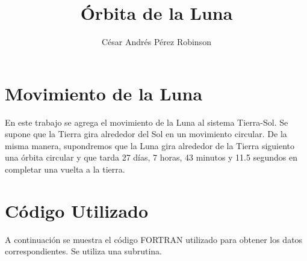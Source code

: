 \documentclass{article}
\title{Órbita de la Luna}
\author{César Andrés Pérez Robinson}
\begin{document}
\maketitle
\section{Movimiento de la Luna}
En este trabajo se agrega el movimiento de la Luna al sistema Tierra-Sol.
Se supone que la Tierra gira alrededor del Sol en un movimiento circular. De la misma manera, supondremos que la Luna gira alrededor de la Tierra siguiento una órbita circular y que tarda 27 días, 7 horas, 43 minutos y 11.5 segundos en completar una vuelta a la tierra.

\section{Código Utilizado}
A continuación se muestra el código FORTRAN utilizado para obtener los datos correspondientes. Se utiliza una subrutina.
\end{document}
